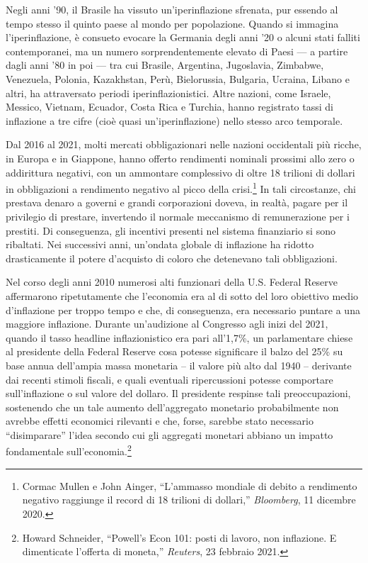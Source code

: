 \documentclass[
  a5paper,
  smalldemyvopaper,10pt,twoside,onecolumn,openright,extrafontsizes,hidelinks]{memoir}
\begin{document}
Negli anni '90, il Brasile ha vissuto un'iperinflazione sfrenata, pur
essendo al tempo stesso il quinto paese al mondo per popolazione. Quando
si immagina l'iperinflazione, è consueto evocare la Germania degli anni
'20 o alcuni stati falliti contemporanei, ma un numero sorprendentemente
elevato di Paesi --- a partire dagli anni '80 in poi --- tra cui
Brasile, Argentina, Jugoslavia, Zimbabwe, Venezuela, Polonia,
Kazakhstan, Perù, Bielorussia, Bulgaria, Ucraina, Libano e altri, ha
attraversato periodi iperinflazionistici. Altre nazioni, come Israele,
Messico, Vietnam, Ecuador, Costa Rica e Turchia, hanno registrato tassi
di inflazione a tre cifre (cioè quasi un'iperinflazione) nello stesso
arco temporale.

Dal 2016 al 2021, molti mercati obbligazionari nelle nazioni occidentali
più ricche, in Europa e in Giappone, hanno offerto rendimenti nominali
prossimi allo zero o addirittura negativi, con un ammontare complessivo
di oltre 18 trilioni di dollari in obbligazioni a rendimento negativo al
picco della crisi.\footnote{Cormac Mullen e John Ainger, ``L'ammasso
  mondiale di debito a rendimento negativo raggiunge il record di 18
  trilioni di dollari,'' \emph{Bloomberg}, 11 dicembre 2020.} In tali
circostanze, chi prestava denaro a governi e grandi corporazioni doveva,
in realtà, pagare per il privilegio di prestare, invertendo il normale
meccanismo di remunerazione per i prestiti. Di conseguenza, gli
incentivi presenti nel sistema finanziario si sono ribaltati. Nei
successivi anni, un'ondata globale di inflazione ha ridotto
drasticamente il potere d'acquisto di coloro che detenevano tali
obbligazioni.

Nel corso degli anni 2010 numerosi alti funzionari della U.S. Federal
Reserve affermarono ripetutamente che l'economia era al di sotto del
loro obiettivo medio d'inflazione per troppo tempo e che, di
conseguenza, era necessario puntare a una maggiore inflazione. Durante
un'audizione al Congresso agli inizi del 2021, quando il tasso headline
inflazionistico era pari all'1,7\%, un parlamentare chiese al presidente
della Federal Reserve cosa potesse significare il balzo del 25\% su base
annua dell'ampia massa monetaria -- il valore più alto dal 1940 --
derivante dai recenti stimoli fiscali, e quali eventuali ripercussioni
potesse comportare sull'inflazione o sul valore del dollaro. Il
presidente respinse tali preoccupazioni, sostenendo che un tale aumento
dell'aggregato monetario probabilmente non avrebbe effetti economici
rilevanti e che, forse, sarebbe stato necessario ``disimparare'' l'idea
secondo cui gli aggregati monetari abbiano un impatto fondamentale
sull'economia.\footnote{Howard Schneider, ``Powell's Econ 101: posti di
  lavoro, non inflazione. E dimenticate l'offerta di moneta,''
  \emph{Reuters}, 23 febbraio 2021.}
\end{document}
